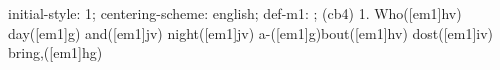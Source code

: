 initial-style: 1;
centering-scheme: english;
def-m1: \grealign;
(cb4) 1. Who([em1]hv) day([em1]g) and([em1]jv) night([em1]jv) a-([em1]g)bout([em1]hv) dost([em1]iv) bring,([em1]hg)
